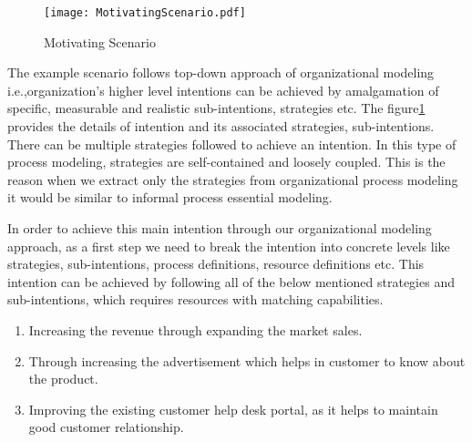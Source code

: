   \begin{figure}
  	\centering
  	\texttt{[image: MotivatingScenario.pdf]}
  	\caption{Motivating Scenario}
  	\label{fig:motivatingscenario}
  \end{figure}
  
 The example scenario follows top-down approach of organizational modeling i.e.,organization's higher level intentions can be achieved by amalgamation of specific, measurable and realistic sub-intentions, strategies etc. The figure\ref{fig:motivatingscenario} provides the details of intention and its associated strategies, sub-intentions. There can be multiple strategies followed to achieve an intention. In this type of process modeling, strategies are self-contained and loosely coupled. This is the reason when we extract only the strategies from organizational process modeling it would be similar to informal process essential modeling. 
 
In order to achieve this main intention through our organizational modeling approach, as a first step we need to break the intention into concrete levels like strategies, sub-intentions, process definitions, resource definitions etc. This intention can be achieved by following all of the below mentioned strategies and sub-intentions, which requires resources with matching capabilities. 
 
 \begin{enumerate}
 	\item Increasing the revenue through expanding the market sales. 
 	\item Through increasing the advertisement which helps in customer to know about the product.
 	\item Improving the existing customer help desk portal, as it helps to maintain good customer relationship.
 \end{enumerate}
 
